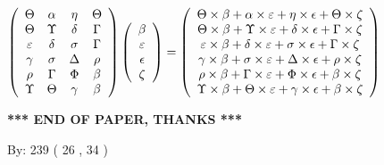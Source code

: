 \documentclass[12pt]{article}
\begin{document}
$  %
 \left( \begin{array}
 {
 c
 c
 c
 c
 }
 \Theta & 
 \alpha & 
 \eta & 
 \Theta \\ 
 \Theta & 
 \Upsilon & 
 \delta & 
 \Gamma \\ 
 \varepsilon & 
 \delta & 
 \sigma & 
 \Gamma \\ 
 \gamma & 
 \sigma & 
 \Delta & 
 \rho \\ 
 \rho & 
 \Gamma & 
 \Phi & 
 \beta \\ 
 \Upsilon & 
 \Theta & 
 \gamma & 
 \beta
 \end{array} \right)
 \left( \begin{array}
 {
 c
 }
 \beta \\ 
 \varepsilon \\ 
 \epsilon \\ 
                    \zeta
 \end{array} \right)
=
 \left( \begin{array}
 {
 c
 }
  \Theta \times  \beta +  \alpha \times  \varepsilon +  \eta \times  \epsilon +  \Theta \times                     \zeta \\ 
  \Theta \times  \beta +  \Upsilon \times  \varepsilon +  \delta \times  \epsilon +  \Gamma \times                     \zeta \\ 
  \varepsilon \times  \beta +  \delta \times  \varepsilon +  \sigma \times  \epsilon +  \Gamma \times                     \zeta \\ 
  \gamma \times  \beta +  \sigma \times  \varepsilon +  \Delta \times  \epsilon +  \rho \times                     \zeta \\ 
  \rho \times  \beta +  \Gamma \times  \varepsilon +  \Phi \times  \epsilon +  \beta \times                     \zeta \\ 
  \Upsilon \times  \beta +  \Theta \times  \varepsilon +  \gamma \times  \epsilon +  \beta \times                     \zeta
 \end{array} \right)
$
 
 
 
   
   
 \vspace{0.2in}
 
   
   
   
   
\vspace{1.0in} 
{\textbf{\large{ *** END OF PAPER, THANKS *** }}} 
   
   
\hspace{1.0in} By: 
         239 (          26 ,           34 )
   
\end{document}
